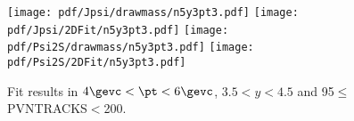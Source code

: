 \begin{figure}[H]
\begin{center}
\texttt{[image: pdf/Jpsi/drawmass/n5y3pt3.pdf]}
\texttt{[image: pdf/Jpsi/2DFit/n5y3pt3.pdf]}
\vspace*{-0.5cm}
\texttt{[image: pdf/Psi2S/drawmass/n5y3pt3.pdf]}
\texttt{[image: pdf/Psi2S/2DFit/n5y3pt3.pdf]}
\vspace*{-0.5cm}
\end{center}
\caption{Fit results in $4\gevc<\pt<6\gevc$, $3.5<y<4.5$ and 95$\leq$PVNTRACKS$<$200.}
\label{Fitn5y3pt3}
\end{figure}
